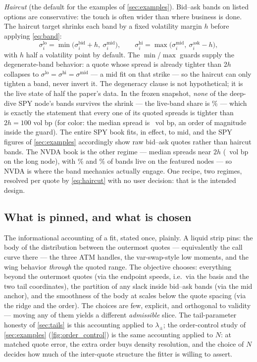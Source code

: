 \emph{Haircut} (the default for the examples of \cref{sec:examples}).
Bid--ask bands on listed options are conservative: the touch is often
wider than where business is done.  The haircut target shrinks each band
by a fixed volatility margin $h$ before applying \eqref{eq:band}:
\begin{equation}
\sigma_i^{\mathrm{lo}}=\min\big(\sigma_i^{\mathrm{bid}}+h,\ \sigma_i^{\mathrm{mid}}\big),
\qquad
\sigma_i^{\mathrm{hi}}=\max\big(\sigma_i^{\mathrm{mid}},\ \sigma_i^{\mathrm{ask}}-h\big),
\label{eq:haircut}
\end{equation}
with $h$ half a volatility point by default.  The $\min$/$\max$ guards
supply the degenerate-band behavior: a quote whose spread is already
tighter than $2h$ collapses to $\sigma^{\mathrm{lo}}=\sigma^{\mathrm{hi}}
=\sigma^{\mathrm{mid}}$ --- a mid fit on that strike --- so the haircut
can only tighten a band, never invert it.  The degeneracy clause is not
hypothetical; it is the live state of half the paper's data.  In the
frozen snapshot, \emph{none} of the deep-dive SPY node's bands survives
the shrink --- the live-band share is \MacSpyDecBandLivePct\% ---
which is exactly the statement that every one of its quoted spreads is
tighter than $2h=100$ vol bp (for color: the median spread is
\MacSpyDecMedianSpreadBp\ vol bp, an order of magnitude inside the
guard).  The entire SPY book fits, in effect, to mid, and the SPY
figures of \cref{sec:examples} accordingly show raw bid--ask quotes
rather than haircut bands.  The NVDA book is the other regime --- median
spreads near $2h$ (\MacNvdaLongMedianSpreadBp\ vol bp on the long node),
with \MacNvdaOneDayBandLivePct\% and \MacNvdaLongBandLivePct\% of bands
live on the featured nodes --- so NVDA is where the band mechanics
actually engage.  One recipe, two regimes, resolved per quote by
\eqref{eq:haircut} with no user decision: that is the intended design.

\subsection{What is pinned, and what is chosen}

The informational accounting of a fit, stated once, plainly.  A liquid
strip pins: the body of the distribution between the outermost quotes ---
equivalently the call curve there --- the three ATM handles, the
var-swap-style low moments, and the wing behavior \emph{through} the
quoted range.  The objective chooses: everything beyond the outermost
quotes (via the endpoint speeds, i.e.\ via the basis and the two tail
coordinates), the partition of any slack inside bid--ask bands (via the
mid anchor), and the smoothness of the body at scales below the quote
spacing (via the ridge and the order).  The choices are few, explicit,
and orthogonal to validity --- moving any of them yields a different
\emph{admissible} slice.  The tail-parameter honesty of \cref{sec:tails}
is this accounting applied to $\lambda_\pm$; the order-control study of
\cref{sec:examples} (\cref{fig:order_control}) is the same accounting
applied to $N$: at matched quote error, the extra order buys density
resolution, and the choice of $N$ decides how much of the inter-quote
structure the fitter is willing to assert.


